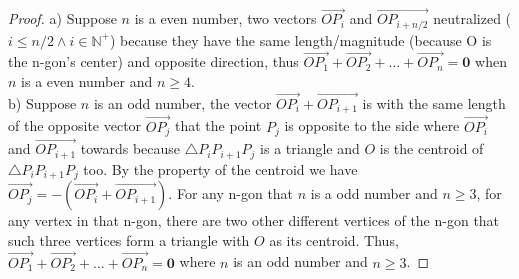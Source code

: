 \documentclass{article}
\begin{document}
\begin{proof}
a) Suppose $n$ is a even number, two vectors $\overrightarrow{OP_i}$ and $\overrightarrow{OP_{i+n/2}}$ neutralized ($i \leq n/2 \wedge i \in \mathbb{N}^+$) because they have the same length/magnitude (because O is the n-gon's center) and opposite direction, thus $\overrightarrow{OP_1} + \overrightarrow{OP_2} + ... + \overrightarrow{OP_n} = \mathbf{0}$ when $n$ is a even number and $n \geq 4$.
\\ b) Suppose $n$ is an odd number, the vector $\overrightarrow{OP_i} + \overrightarrow{OP_{i+1}}$ is with the same length of the opposite vector $\overrightarrow{OP_j}$ that the point $P_j$ is opposite to the side where $\overrightarrow{OP_i}$ and $\overrightarrow{OP_{i+1}}$ towards because $\bigtriangleup P_iP_{i+1}P_j$ is a triangle and $O$ is the centroid of $\bigtriangleup P_iP_{i+1}P_j$ too. By the property of the centroid we have  $\overrightarrow{OP_j} = - (\overrightarrow{OP_i} + \overrightarrow{OP_{i+1}})$. For any n-gon that $n$ is a odd number and $n \geq 3$, for any vertex in that n-gon, there are two other different vertices of the n-gon that such three vertices form a triangle with $O$ as its centroid. Thus, $\overrightarrow{OP_1} + \overrightarrow{OP_2} + ... + \overrightarrow{OP_n} = \mathbf{0}$ where $n$ is an odd number and $n \geq 3$.
\end{proof}
%
%
\end{document}
